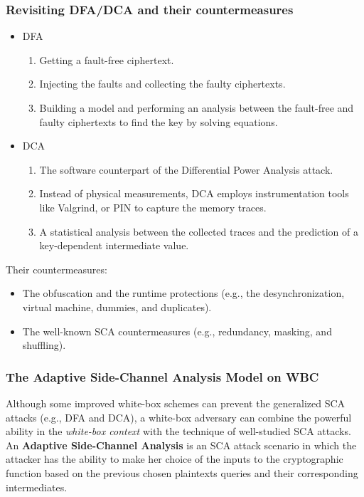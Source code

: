 \documentclass{beamer}
\begin{document}
\frame
{
	\frametitle{Revisiting DFA/DCA and their countermeasures}
	\begin{itemize}
		\item DFA
        \begin{enumerate}
        \item Getting a fault-free ciphertext.
	    \item Injecting the faults and collecting the faulty ciphertexts.
	    \item Building a model and performing an analysis between the fault-free and faulty ciphertexts to find the key by solving equations.
        \end{enumerate}
        \item DCA
        \begin{enumerate}
	    \item The software counterpart of the Differential Power Analysis attack. 
	    \item Instead of physical measurements, DCA employs instrumentation tools like Valgrind, or PIN to capture the  memory traces.
	    \item A statistical analysis between the collected traces and the prediction of a key-dependent intermediate value.
        \end{enumerate}
    \end{itemize}

    Their countermeasures:   
	\begin{itemize}
		\item The obfuscation and the runtime protections (e.g., the desynchronization, virtual machine, dummies, and duplicates).
		\item The well-known SCA countermeasures (e.g., redundancy, masking, and shuffling).
	\end{itemize}
}

\frame
{
	\frametitle{The Adaptive Side-Channel Analysis Model on WBC}
	Although some improved white-box schemes can prevent the generalized SCA attacks (e.g., DFA and DCA), a white-box adversary can combine the powerful ability in the \textit{white-box context} with the technique of well-studied SCA attacks.
	\\[2ex]
	An \textbf{Adaptive Side-Channel Analysis} is an SCA attack scenario in which the attacker has the ability
	to make her choice of the inputs to the cryptographic function based on the previous chosen plaintexts queries and their corresponding intermediates.
}
\end{document}
